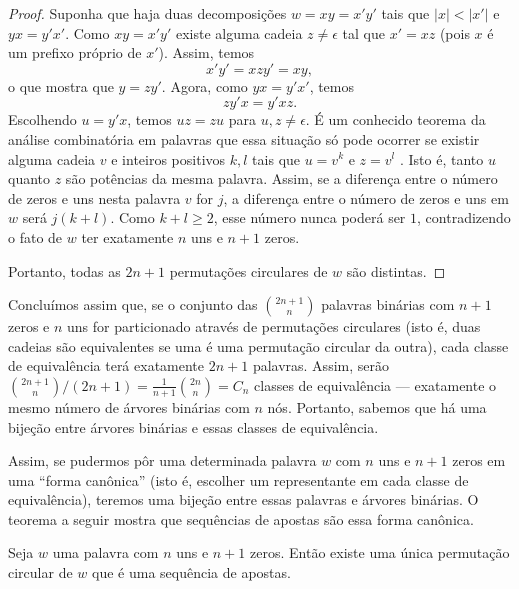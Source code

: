 \begin{proof}
    Suponha que haja duas decomposições $w = xy = x'y'$
    tais que $|x| < |x'|$ e $yx = y'x'$.
    Como $xy = x'y'$
    existe alguma cadeia $z \neq \epsilon$
    tal que $x' = xz$
    (pois $x$ é um prefixo próprio de $x'$).
    Assim, temos
    \begin{equation*}
        x'y' = xzy' = xy,
    \end{equation*}
    o que mostra que $y = zy'$.
    Agora,
    como $yx = y'x'$,
    temos
    \begin{equation*}
        zy'x = y'xz.
    \end{equation*}
    Escolhendo $u = y'x$, temos $uz = zu$
    para $u, z \neq \epsilon$.
    É um conhecido teorema da análise combinatória em palavras
    que essa situação só pode ocorrer se
    existir alguma cadeia $v$ e inteiros positivos $k, l$ tais que
    $u = v^k$ e $z = v^l$ \cite[p.~32]{Shallit2008}.
    Isto é, tanto $u$ quanto $z$ são potências da mesma palavra.
    Assim,
    se a diferença entre o número de zeros e uns nesta palavra $v$ for $j$,
    a diferença entre o número de zeros e uns em $w$ será $j(k + l)$.
    Como $k + l \geq 2$,
    esse número nunca poderá ser $1$,
    contradizendo o fato de $w$ ter exatamente $n$ uns e $n+1$ zeros.

    Portanto, todas as $2n+1$ permutações circulares de $w$ são distintas.
\end{proof}

Concluímos assim que,
se o conjunto das $\binom{2n+1}{n}$ palavras binárias com $n+1$ zeros e $n$ uns
for particionado através de permutações circulares
(isto é, duas cadeias são equivalentes se uma é uma permutação circular da outra),
cada classe de equivalência terá exatamente $2n+1$ palavras.
Assim,
serão $\binom{2n+1}{n}/(2n+1) = \frac{1}{n+1} \binom{2n}{n} = C_n$
classes de equivalência
--- exatamente o mesmo número de árvores binárias com $n$ nós.
Portanto,
sabemos que há uma bijeção entre árvores binárias e essas classes de equivalência.

Assim,
se pudermos pôr uma determinada palavra $w$ com $n$ uns e $n+1$ zeros
em uma ``forma canônica''
(isto é, escolher um representante em cada classe de equivalência),
teremos uma bijeção entre essas palavras e árvores binárias.
O teorema a seguir mostra que
sequências de apostas são essa forma canônica.

\begin{lemma}
    Seja $w$ uma palavra com $n$ uns e $n+1$ zeros.
    Então existe uma única permutação circular de $w$
    que é uma sequência de apostas.
\end{lemma}

